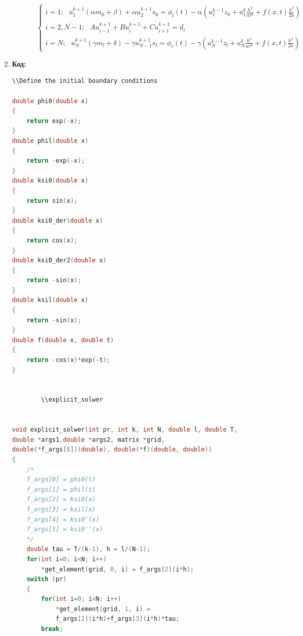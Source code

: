 \documentclass[12pt]{article}
\begin{document}
\begin{enumerate}
\begin{enumerate}
\begin{itemize}
\begin{equation*}
\begin{cases}
                    i=1;\:\:\: u_1^{k+1}(\alpha m_0+\beta) + \alpha u_2^{k+1}s_0 = \phi_l(t)-\alpha\left( u_1^{k-1}z_0 + u_1^k\frac{h^2}{a\tau^2}  + f(x,t)\frac{h^2}{2a}\right)
                    \\
                    i=\overline{2,N-1};\:\:\:Au_{i-1}^{k+1} + Bu_i^{k+1} +Cu_{i+1}^{k+1}=d_i
                    \\
                    i=N;\:\:\: u_{N}^{k+1}(\gamma m_l+\delta) - \gamma u_{N-1}^{k+1}s_l = \phi_r(t) - \gamma\left( u_{N}^{k-1}z_l + u_{N}^{k}\frac{h^2}{a\tau^2} + f(x,t)\frac{h^2}{2a} \right)
                \end{cases}
            \end{equation*}
        \end{itemize}
    \end{enumerate}
        \item \textbf{Код:}\\
        \begin{lstlisting}[language=C]
        \\Define the initial boundary conditions

double phi0(double x)
{
    return exp(-x);
} 
double phil(double x)
{
    return -exp(-x);
} 
double ksi0(double x)
{
    return sin(x);
}
double ksi0_der(double x)
{
    return cos(x);
}
double ksi0_der2(double x)
{
    return -sin(x);
}
double ksil(double x)
{
    return -sin(x);
}
double f(double x, double t)
{
    return -cos(x)*exp(-t);
}


        \\explicit_solwer


void explicit_solwer(int pr, int k, int N, double l, double T, 
double *args1,double *args2, matrix *grid,
double(*f_args[6])(double), double(*f)(double, double))
{
    /*
    f_args[0] = phi0(t)
    f_args[1] = phil(t)
    f_args[2] = ksi0(x)
    f_args[3] = ksil(x)
    f_args[4] = ksi0'(x)
    f_args[5] = ksi0''(x)
    */
    double tau = T/(k-1), h = l/(N-1);
    for(int i=0; i<N; i++)
        *get_element(grid, 0, i) = f_args[2](i*h);
    switch (pr)
    {
        for(int i=0; i<N; i++)
            *get_element(grid, 1, i) = 
            f_args[2](i*h)+f_args[3](i*h)*tau;
        break;


\end{lstlisting}
\end{enumerate}
\end{document}
